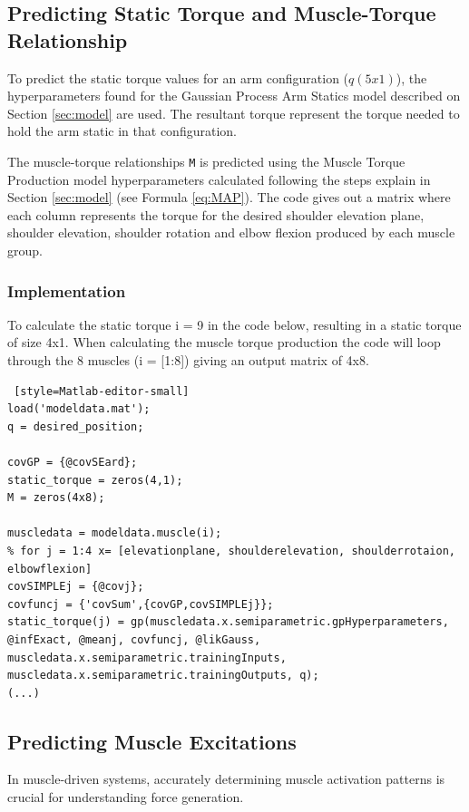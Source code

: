 \subsection{Predicting Static Torque and Muscle-Torque Relationship}

To predict the static torque values for an arm configuration ($q (5x1)$), the hyperparameters found for the Gaussian Process Arm Statics model described on Section \ref{sec:model} are used. The resultant torque represent the torque needed to hold the arm static in that configuration.

The muscle-torque relationships \texttt{M} is predicted using the Muscle Torque Production model hyperparameters calculated following the steps explain in Section \ref{sec:model} (see Formula \ref{eq:MAP}). The code gives out a matrix where each column represents the torque for the desired shoulder elevation plane, shoulder elevation, shoulder rotation and elbow flexion produced by each muscle group.

\subsubsection{Implementation}
To calculate the static torque i = 9 in the code below, resulting in a static torque of size 4x1.  When calculating the muscle torque production the code will loop through the 8 muscles (i = [1:8]) giving an output matrix of 4x8.

\begin{lstlisting} [style=Matlab-editor-small]
load('modeldata.mat');
q = desired_position;

covGP = {@covSEard};
static_torque = zeros(4,1);
M = zeros(4x8);

muscledata = modeldata.muscle(i);
% for j = 1:4 x= [elevationplane, shoulderelevation, shoulderrotaion, elbowflexion]
covSIMPLEj = {@covj};
covfuncj = {'covSum',{covGP,covSIMPLEj}};
static_torque(j) = gp(muscledata.x.semiparametric.gpHyperparameters, @infExact, @meanj, covfuncj, @likGauss, muscledata.x.semiparametric.trainingInputs, muscledata.x.semiparametric.trainingOutputs, q);
(...)
\end{lstlisting}


\subsection{Predicting Muscle Excitations}\label{computemuscleexcitation}

In muscle-driven systems, accurately determining muscle activation patterns is crucial for understanding force generation. 

